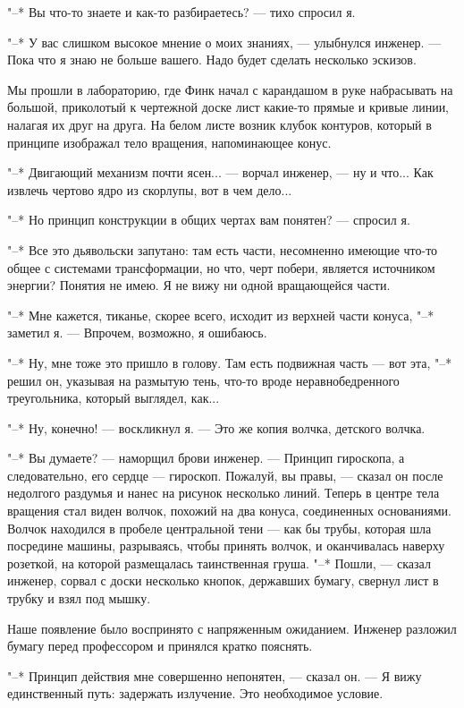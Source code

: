 "--* Вы что-то знаете и как-то разбираетесь? --- тихо спросил я.

"--* У вас слишком высокое мнение о моих знаниях, --- улыбнулся  инженер.  ---
Пока что я знаю не больше вашего. Надо будет сделать несколько эскизов.

Мы прошли в лабораторию, где Финк начал с карандашом в руке набрасывать
на большой, приколотый к чертежной доске лист  какие-то  прямые  и  кривые
линии, налагая их друг на друга. На белом листе  возник  клубок  контуров,
который в принципе изображал тело вращения, напоминающее конус.

"--* Двигающий механизм почти ясен... --- ворчал инженер, --- ну и что...  Как
извлечь чертово ядро из скорлупы, вот в чем дело...

"--* Но принцип конструкции в общих чертах вам понятен? --- спросил я.

"--* Все это дьявольски  запутано:  там  есть  части,  несомненно  имеющие
что-то общее с системами трансформации,  но  что,  черт  побери,  является
источником энергии? Понятия не имею. Я не вижу ни одной вращающейся части.

"--* Мне кажется, тиканье, скорее всего, исходит из верхней части  конуса,
"--* заметил я. --- Впрочем, возможно, я ошибаюсь.

"--* Ну, мне тоже это пришло в голову. Там есть подвижная часть --- вот эта,
"--* решил он, указывая на  размытую  тень,  что-то  вроде  неравнобедренного
треугольника, который выглядел, как...

"--* Ну, конечно! --- воскликнул я. --- Это же копия волчка, детского волчка.

"--* Вы  думаете?  ---  наморщил  брови  инженер.  ---  Принцип  гироскопа,  а
следовательно, его сердце --- гироскоп. Пожалуй, вы правы, --- сказал он после
недолгого раздумья и нанес на рисунок несколько  линий.  Теперь  в  центре
тела вращения стал  виден  волчок,  похожий  на  два  конуса,  соединенных
основаниями. Волчок находился в пробеле центральной тени --- как  бы  трубы,
которая  шла  посредине  машины,  разрываясь,  чтобы  принять  волчок,   и
оканчивалась наверху розеткой, на которой размещалась таинственная  груша.
"--* Пошли, --- сказал инженер, сорвал  с  доски  несколько  кнопок,  державших
бумагу, свернул лист в трубку и взял под мышку.

Наше  появление  было  воспринято  с  напряженным  ожиданием.   Инженер
разложил бумагу перед профессором и принялся кратко пояснять.

"--* Принцип действия мне совершенно непонятен, ---  сказал  он.  ---  Я  вижу
единственный путь: задержать излучение. Это необходимое условие.


